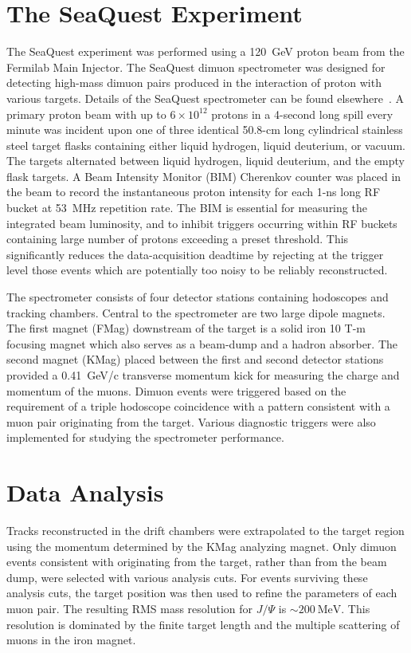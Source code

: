 \documentclass[reprint,aps,unsortedaddress,superscriptaddress,prd,floatfix,showpacs,linenumbers]{revtex4-2}
\begin{document}
\section{The SeaQuest Experiment}
\label{sec:SeaQuest}
The SeaQuest experiment was performed using a \SI{120}{\GeV} proton beam from the 
Fermilab Main Injector. The SeaQuest dimuon spectrometer was designed for
detecting high-mass dimuon pairs produced in the interaction of proton
with various targets. Details of the SeaQuest spectrometer can be found
elsewhere~\cite{aidala2019}. A primary proton beam with up to $6 \times
10^{12}$ protons in a 4-second long spill every minute was incident upon one
of three identical 50.8-cm long cylindrical stainless steel
target flasks containing either liquid hydrogen, liquid deuterium,
or vacuum. The targets alternated between liquid hydrogen, liquid deuterium,
and the empty flask targets. A Beam Intensity Monitor (BIM) Cherenkov counter 
was placed in the beam to record the instantaneous proton intensity for 
each 1-ns long RF bucket at \SI{53}{\MHz} repetition rate. The BIM is essential
for measuring the integrated beam luminosity, and to inhibit triggers
occurring within RF buckets containing large number of protons 
exceeding a preset threshold. This significantly reduces the data-acquisition
deadtime by rejecting at the trigger level those events which are potentially
too noisy to be reliably reconstructed.  

The spectrometer consists of four detector stations containing
hodoscopes and tracking chambers.
Central to the spectrometer are two large dipole magnets. 
The first magnet (FMag) downstream of the target is a solid iron 10 
T-m focusing magnet which
also serves as a beam-dump and a hadron absorber. The second
magnet (KMag) placed between the first and second detector stations
provided a \SI{0.41}{\GeV/c} transverse momentum kick
for measuring the charge and momentum of the muons. Dimuon events
were triggered based on the requirement of a triple hodoscope
coincidence with a pattern consistent with a muon pair originating
from the target. Various diagnostic triggers were also implemented
for studying the spectrometer performance. 

\section{Data Analysis}
\label{sec:analysis}
Tracks reconstructed in the drift chambers were extrapolated
to the target region using the momentum determined by
the KMag analyzing magnet. Only dimuon events consistent with originating
from the target, rather than from the beam dump, were selected with various
analysis cuts. For events surviving these analysis cuts, the target
position was then used to
refine the parameters of each muon pair. The resulting
RMS mass resolution for $J/\Psi$ is $\sim\SI{200}{\MeV}$.
This resolution is dominated by the finite target length and the
multiple scattering of muons in the iron magnet.
\end{document}
